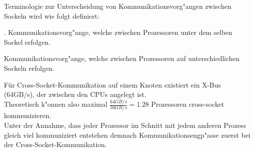 Terminologie zur Unterscheidung von Kommunikationsvorg"angen zwischen Sockeln wird wie folgt definiert:\\
\begin{defi}.
Kommunikationsvorg"ange, welche zwischen Prozessoren unter dem selben Sockel erfolgen.
\end{defi}
\begin{defi}
Kommunikationsvorg"ange, welche zwischen Prozessoren auf unterschiedlichen Sockeln erfolgen.
\end{defi}
Für Cross-Socket-Kommunikation auf einem Knoten existiert ein X-Bus (64GB/s), der zwischen den CPUs angelegt ist.\\
Theoretisch k"onnen also maximal $\frac{64GB/s}{50GB/s} = 1.28$ Prozessoren cross-socket kommunizieren.\\
Unter der Annahme, dass jeder Prozessor im Schnitt mit jedem anderen Prozess gleich viel kommuniziert  entstehen demnach Kommunikationsengp"asse zuerst bei der Cross-Socket-Kommunikation.\\

